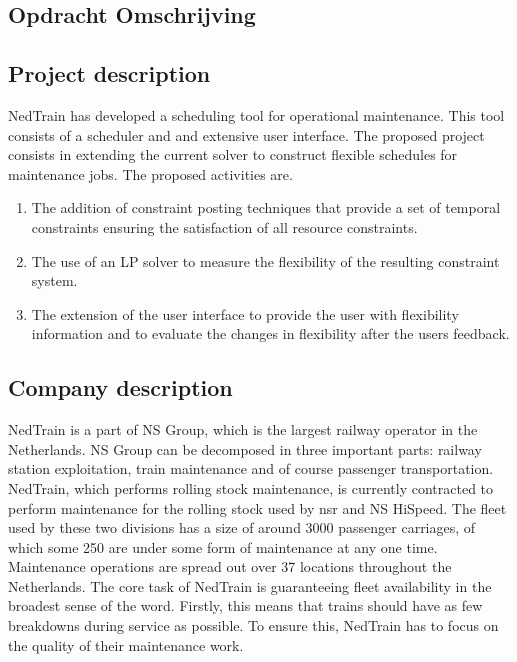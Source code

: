 \begin{appendices}
\section{Opdracht Omschrijving} \label{app:A}
\subsection*{Project description}
NedTrain has developed a scheduling tool for operational maintenance. This tool consists of a scheduler and and extensive user interface. The proposed project consists in extending the current solver to construct flexible schedules for maintenance jobs. The proposed activities are.

\begin{enumerate}
	\item The addition of constraint posting techniques that provide a set of temporal constraints ensuring the satisfaction of all resource constraints.
	\item The use of an LP solver to measure the flexibility of the resulting constraint system.
	\item The extension of the user interface to provide the user with flexibility information and to evaluate the changes in flexibility after the users feedback.
\end{enumerate}

\subsection*{Company description}

NedTrain is a part of NS Group, which is the largest railway operator in the Netherlands. NS Group can be decomposed in three important parts: railway station exploitation, train maintenance and of course passenger transportation. NedTrain, which performs rolling stock maintenance, is currently contracted to perform maintenance for the rolling stock used by nsr and NS HiSpeed. The fleet used by these two divisions has a size of around 3000 passenger carriages, of which some 250 are under some form of maintenance at any one time. Maintenance operations are spread out over 37 locations throughout the Netherlands. The core task of NedTrain is guaranteeing fleet availability in the broadest sense of the word. Firstly, this means that trains should have as few breakdowns during service as possible. To ensure this, NedTrain has to focus on the quality of their maintenance work.


\end{appendices}
